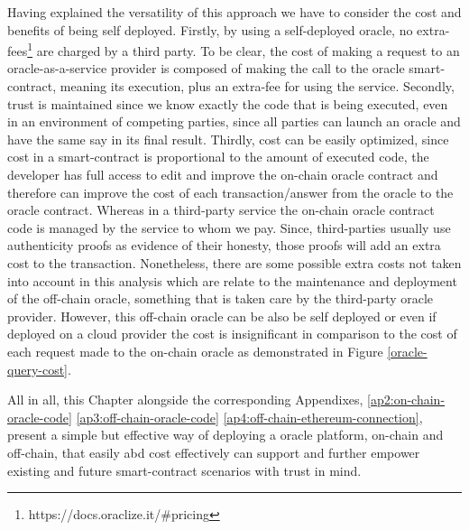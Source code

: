 Having explained the versatility of this approach we have to consider the cost and benefits of being self deployed. Firstly, by using a self-deployed oracle, no extra-fees\footnote{https://docs.oraclize.it/\#pricing} are charged by a third party. To be clear, the cost of making a request to an oracle-as-a-service provider is composed of making the call to the oracle smart-contract, meaning its execution, plus an extra-fee for using the service. Secondly, trust is maintained since we know exactly the code that is being executed, even in an environment of competing parties, since all parties can launch an oracle and have the same say in its final result. Thirdly, cost can be easily optimized, since cost in a smart-contract is proportional to the amount of executed code, the developer has full access to edit and improve the on-chain oracle contract and therefore can improve the cost of each transaction/answer from the oracle to the oracle contract. Whereas in a third-party service the on-chain oracle contract code is managed by the service to whom we pay. Since, third-parties usually use authenticity proofs as evidence of their honesty, those proofs will add an extra cost to the transaction. Nonetheless, there are some possible extra costs not taken into account in this analysis which are relate to the maintenance and deployment of the off-chain oracle, something that is taken care by the third-party oracle provider. However, this off-chain oracle can be also be self deployed or even if deployed on a cloud provider the cost is insignificant in comparison to the cost of each request made to the on-chain oracle as demonstrated in Figure \ref{oracle-query-cost}.

All in all, this Chapter alongside the corresponding Appendixes, \ref{ap2:on-chain-oracle-code} \ref{ap3:off-chain-oracle-code} \ref{ap4:off-chain-ethereum-connection}, present a simple but effective way of deploying a oracle platform, on-chain and off-chain, that easily abd cost effectively can support and further empower existing and future smart-contract scenarios with trust in mind.